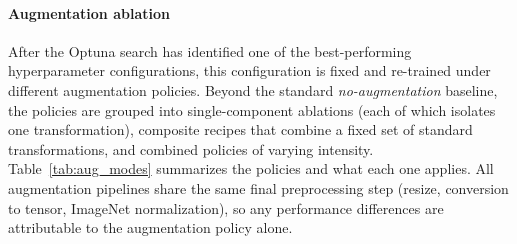 \documentclass[conference]{IEEEtran}
\begin{document}
\paragraph{Augmentation ablation}
After the Optuna search has identified one of the best-performing hyperparameter configurations, this configuration is fixed and re-trained under different augmentation policies. Beyond the standard \emph{no-augmentation} baseline, the policies are grouped into single-component ablations (each of which isolates one transformation), composite recipes that combine a fixed set of standard transformations, and combined policies of varying intensity. Table~\ref{tab:aug_modes} summarizes the policies and what each one applies. All augmentation pipelines share the same final preprocessing step (resize, conversion to tensor, ImageNet normalization), so any performance differences are attributable to the augmentation policy alone.
\end{document}
